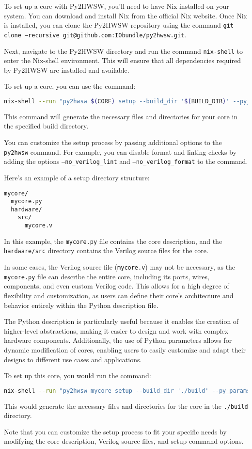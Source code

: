 %

To set up a core with Py2HWSW, you'll need to have Nix installed on your system. You can download and install Nix from the official Nix website. Once Nix is installed, you can clone the Py2HWSW repository using the command \texttt{git clone --recursive git@github.com:IObundle/py2hwsw.git}.

Next, navigate to the Py2HWSW directory and run the command \texttt{nix-shell} to enter the Nix-shell environment. This will ensure that all dependencies required by Py2HWSW are installed and available.

To set up a core, you can use the command:
\begin{lstlisting}[language=bash]
nix-shell --run "py2hwsw $(CORE) setup --build_dir '$(BUILD_DIR)' --py_params 'param1=param1_val:param2=param2_val'"
\end{lstlisting}

This command will generate the necessary files and directories for your core in the specified build directory.

You can customize the setup process by passing additional options to the \texttt{py2hwsw} command. For example, you can disable format and linting checks by adding the options \texttt{--no\_verilog\_lint} and \texttt{--no\_verilog\_format} to the command.

Here's an example of a setup directory structure:
\begin{verbatim}
mycore/
  mycore.py
  hardware/
    src/
      mycore.v
\end{verbatim}
In this example, the \texttt{mycore.py} file contains the core description, and the \texttt{hardware/src} directory contains the Verilog source files for the core.

In some cases, the Verilog source file (\texttt{mycore.v}) may not be necessary, as the \texttt{mycore.py} file can describe the entire core, including its ports, wires, components, and even custom Verilog code. This allows for a high degree of flexibility and customization, as users can define their core's architecture and behavior entirely within the Python description file.

The Python description is particularly useful because it enables the creation of higher-level abstractions, making it easier to design and work with complex hardware components. Additionally, the use of Python parameters allows for dynamic modification of cores, enabling users to easily customize and adapt their designs to different use cases and applications.

To set up this core, you would run the command:
\begin{lstlisting}[language=bash]
nix-shell --run "py2hwsw mycore setup --build_dir './build' --py_params 'param1=param1_val:param2=param2_val'"
\end{lstlisting}

This would generate the necessary files and directories for the core in the \texttt{./build} directory.

Note that you can customize the setup process to fit your specific needs by modifying the core description, Verilog source files, and setup command options.

